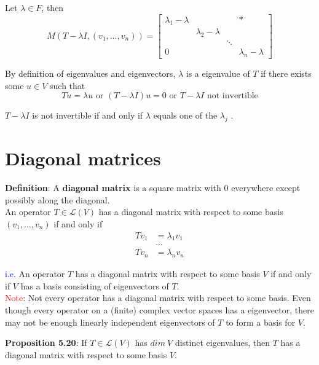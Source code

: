 \documentclass[a4paper, 10pt]{report}
\begin{document}
Let $\lambda \in F$, then
\[
  M(T - \lambda I, (v_1, \hdots, v_n)) = \begin{bmatrix} 
     \lambda_1 - \lambda & & & * \\  
     & \lambda_2 - \lambda& &  \\  
     & & \ddots &  \\  
     0 & &  & \lambda_n  - \lambda
  \end{bmatrix}
\] 

By definition of eigenvalues and eigenvectors, $\lambda$ is a eigenvalue of $T$ if there exists some $u \in V$ such that
\[
  Tu = \lambda u \text{ or }  (T - \lambda I) u = 0 \text{ or } T - \lambda I \text{ not invertible}
\] 

$T - \lambda I$ is not invertible if and only if $\lambda$ equals one of the $\lambda_j$ . 

\section{Diagonal matrices}
\begin{framed}
   \textbf{Definition}: A \textbf{diagonal matrix} is a square matrix with $0$ everywhere except possibly along the diagonal.  \\

   An operator $T \in \mathcal{L}(V)$ has a diagonal matrix with respect to some basis $(v_1, \hdots, v_n)$ if and only if
   \begin{align*}
      Tv_1 &= \lambda_1 v_1 \\
           & \hdots \\
      Tv_n &= \lambda_n v_n
   \end{align*}
\end{framed}

\textcolor{blue}{i.e.} An operator $T$ has a diagonal matrix with respect to some basis $V$ if and only if $V$ has a basis consisting of eigenvectors of $T$.  \\

\textcolor{red}{Note}: Not every operator has a diagonal matrix with respect to some basis. Even though every operator on a (finite) complex vector spaces has a eigenvector, there may not be enough linearly independent eigenvectors of $T$ to form a basis for $V$.

\begin{framed}
   \textbf{Proposition 5.20}: If $T \in \mathcal{L}(V)$ has  $dim\ V$ distinct eigenvalues, then $T$ has a diagonal matrix with respect to some basis $V$. 
\end{framed}
\end{document}
